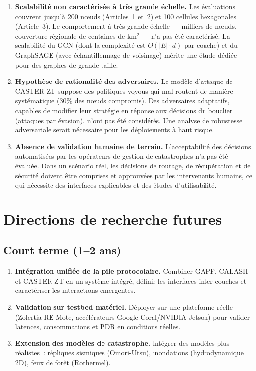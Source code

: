 \begin{enumerate}
    \item \textbf{Scalabilité non caractérisée à très grande échelle.} Les évaluations couvrent jusqu'à 200 n\oe{}uds (Articles~1 et~2) et 100 cellules hexagonales (Article~3). Le comportement à très grande échelle --- milliers de n\oe{}uds, couverture régionale de centaines de km$^2$ --- n'a pas été caractérisé. La scalabilité du GCN (dont la complexité est $O(|E| \cdot d)$ par couche) et du GraphSAGE (avec échantillonnage de voisinage) mérite une étude dédiée pour des graphes de grande taille.

    \item \textbf{Hypothèse de rationalité des adversaires.} Le modèle d'attaque de CASTER-ZT suppose des politiques voyous qui mal-routent de manière systématique (30\% des n\oe{}uds compromis). Des adversaires adaptatifs, capables de modifier leur stratégie en réponse aux décisions du bouclier (attaques par évasion), n'ont pas été considérés. Une analyse de robustesse adversariale serait nécessaire pour les déploiements à haut risque.

    \item \textbf{Absence de validation humaine de terrain.} L'acceptabilité des décisions automatisées par les opérateurs de gestion de catastrophes n'a pas été évaluée. Dans un scénario réel, les décisions de routage, de récupération et de sécurité doivent être comprises et approuvées par les intervenants humains, ce qui nécessite des interfaces explicables et des études d'utilisabilité.
\end{enumerate}

\section{Directions de recherche futures}\label{sec:concl-futures}

\subsection{Court terme (1--2 ans)}

\begin{enumerate}
    \item \textbf{Intégration unifiée de la pile protocolaire.} Combiner GAPF, CALASH et CASTER-ZT en un système intégré, définir les interfaces inter-couches et caractériser les interactions émergentes.
    \item \textbf{Validation sur testbed matériel.} Déployer sur une plateforme réelle (Zolertia RE-Mote, accélérateurs Google Coral/NVIDIA Jetson) pour valider latences, consommations et PDR en conditions réelles.
    \item \textbf{Extension des modèles de catastrophe.} Intégrer des modèles plus réalistes~: répliques sismiques (Omori-Utsu), inondations (hydrodynamique 2D), feux de forêt (Rothermel).
\end{enumerate}

